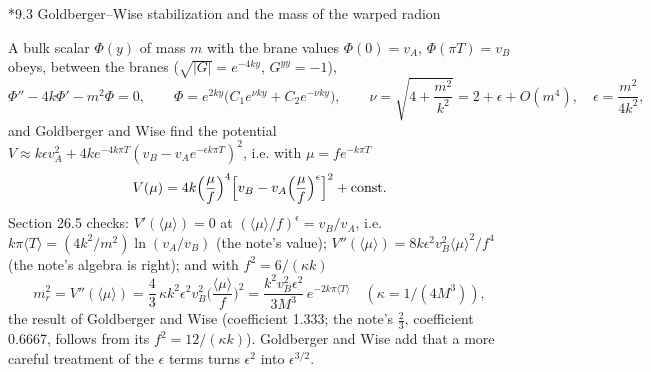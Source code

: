 \documentclass[10pt,a4paper]{article}
\makeatletter
\renewcommand\subsection{\@startsection{subsection}{2}{\z@}{-3.25ex\@plus -1ex \@minus -.2ex}{1.5ex \@plus .2ex}{\normalfont\large\bfseries\raggedright}}
\makeatother
\begin{document}
\subsection*{9.3 Goldberger–Wise stabilization and the mass of the warped radion}
A bulk scalar $\Phi(y)$ of mass $m$ with the brane values $\Phi(0)=v_A$, $\Phi(\pi T)=v_B$ obeys, between the branes ($\sqrt{|G|}=e^{-4ky}$, $G^{yy}=-1$),
\begin{equation*}
\Phi''-4k\Phi'-m^2\Phi=0,\qquad \Phi=e^{2ky}\big(C_1e^{\nu ky}+C_2e^{-\nu ky}\big),\qquad \nu=\sqrt{4+\frac{m^2}{k^2}}=2+\epsilon+O(m^4),\quad \epsilon=\frac{m^2}{4k^2},
\end{equation*}
and Goldberger and Wise find the potential $V\approx k\epsilon v_A^2+4ke^{-4k\pi T}(v_B-v_Ae^{-\epsilon k\pi T})^2$, i.e. with $\mu=fe^{-k\pi T}$
\begin{equation*}
V(\mu)=4k\Big(\frac\mu f\Big)^4\Big[v_B-v_A\Big(\frac\mu f\Big)^\epsilon\Big]^2+{\rm const}.
\end{equation*}
Section 26.5 checks: $V'(\langle\mu\rangle)=0$ at $(\langle\mu\rangle/f)^\epsilon=v_B/v_A$, i.e. $k\pi\langle T\rangle=(4k^2/m^2)\ln(v_A/v_B)$ (the note’s value); $V''(\langle\mu\rangle)=8k\epsilon^2v_B^2\langle\mu\rangle^2/f^4$ (the note’s algebra is right); and with $f^2=6/(\kappa k)$
\begin{equation*}
m_r^2=V''(\langle\mu\rangle)=\frac43\,\kappa k^2\epsilon^2v_B^2\Big(\frac{\langle\mu\rangle}f\Big)^2=\frac{k^2v_B^2\epsilon^2}{3M^3}\,e^{-2k\pi\langle T\rangle}\quad(\kappa=1/(4M^3)),
\end{equation*}
the result of Goldberger and Wise (coefficient 1.333; the note’s $\frac23$, coefficient 0.6667, follows from its $f^2=12/(\kappa k)$). Goldberger and Wise add that a more careful treatment of the $\epsilon$ terms turns $\epsilon^2$ into $\epsilon^{3/2}$.
\end{document}
